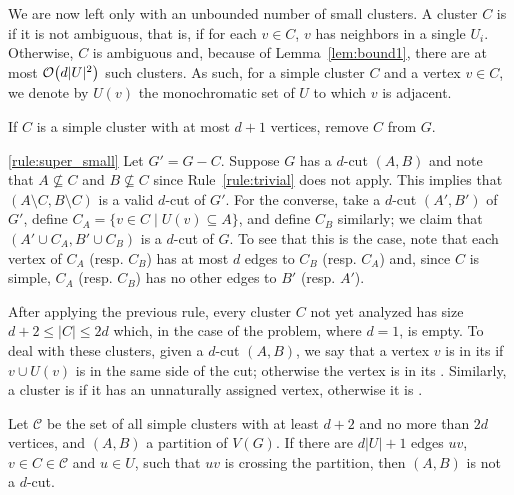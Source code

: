 We are now left only with an unbounded number of small clusters.
A cluster $C$ is  if it is not ambiguous, that is, if for each $v \in C$, $v$ has neighbors in a single $U_i$.
Otherwise, $C$ is ambiguous and, because of Lemma~\ref{lem:bound1}, there are at most $\mathcal{O}\!\left(d|U|^2\right)$ such clusters.
As such, for a simple cluster $C$ and a vertex $v \in C$, we denote by $U(v)$ the monochromatic set of $U$ to which $v$ is adjacent.

\begin{rrule}
    \label{rule:super_small}
    If $C$ is a simple cluster with at most $d+1$ vertices, remove $C$ from $G$.
\end{rrule}

\begin{sproof}{\ref{rule:super_small}}
    Let $G' = G - C$.
    Suppose $G$ has a $d$-cut $(A,B)$ and note that $A \nsubseteq C$ and $B \nsubseteq C$ since Rule~\ref{rule:trivial} does not apply.
    This implies that $(A \setminus C, B \setminus C)$ is a valid $d$-cut of $G'$.
    For the converse, take a $d$-cut $(A', B')$ of $G'$, define $C_A = \{v \in C \mid U(v) \subseteq A\}$, and define $C_B$ similarly; we claim that $(A' \cup C_A, B' \cup C_B)$ is a $d$-cut of $G$.
    To see that this is the case, note that each vertex of $C_A$ (resp. $C_B$) has at most $d$ edges to $C_B$ (resp. $C_A$) and, since $C$ is simple, $C_A$ (resp. $C_B$) has no other edges to $B'$ (resp. $A'$).
\end{sproof}

After applying the previous rule, every cluster $C$ not yet analyzed has size $d+2 \leq |C| \leq 2d$ which, in the case of the  problem, where $d=1$, is empty.
To deal with these clusters, given a $d$-cut $(A, B)$, we say that a vertex $v$ is in its  if $v \cup U(v)$ is in the same side of the cut; otherwise the vertex is in its .
Similarly, a cluster is  if it has an unnaturally assigned vertex, otherwise it is .

\begin{observation}
    \label{obs:constrained_unnatural}
    Let $\mathcal{C}$ be the set of all simple clusters with at least $d+2$ and no more than $2d$ vertices, and $(A,B)$ a partition of $V(G)$.
    If there are $d|U|+1$ edges $uv$, $v \in C \in \mathcal{C}$ and $u \in U$, such that $uv$ is crossing the partition, then $(A,B)$ is not a $d$-cut.
\end{observation}


